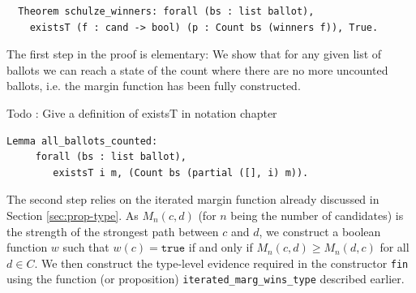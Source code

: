 \begin{verbatim}
  Theorem schulze_winners: forall (bs : list ballot),
    existsT (f : cand -> bool) (p : Count bs (winners f)), True.
\end{verbatim}


\noindent
The first step in the proof is elementary: We show that for any
given
list of ballots we can reach a state of the count where there are
no more uncounted ballots, i.e. the margin function has been
fully constructed.

Todo : Give a definition of existsT in  notation chapter

\begin{verbatim}
Lemma all_ballots_counted:
     forall (bs : list ballot), 
        existsT i m, (Count bs (partial ([], i) m)).
\end{verbatim}
    

   
   
The second step relies on the iterated margin function already
discussed in Section \ref{sec:prop-type}. As $M_n(c, d)$ (for $n$ being
the number of candidates) is the strength of the strongest path
between $c$ and $d$, we construct a boolean function
$w$ such that $w(c) = \mathtt{true}$ if and only if $M_n(c, d) \geq
M_n(d, c)$ for all $d \in C$. We then construct the type-level
evidence required in the constructor \texttt{fin} 
using  the function (or proposition)
\texttt{iterated\_marg\_wins\_type} described earlier. 


